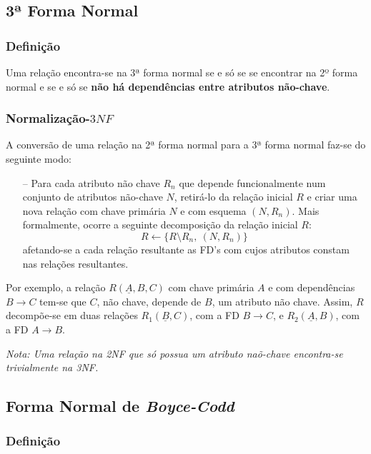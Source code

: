 \documentclass[oneside]{book}
\theoremstyle{definition}
\begin{document}
\subsection{3ª Forma Normal}

\subsubsection*{Definição}

Uma relação encontra-se na 3ª forma normal se e só se se encontrar na 2º forma normal e se e só se \textbf{não há dependências entre atributos não-chave}.

\subsubsection*{Normalização-$3NF$}

A conversão de uma relação na 2ª forma normal para a 3ª forma normal faz-se do seguinte modo:

\begin{itemize}
    \itemsep0cm
    \item[--] Para cada atributo não chave $R_n$ que depende funcionalmente num conjunto de atributos não-chave $N$, retirá-lo da relação inicial $R$ e criar uma nova relação com chave primária $N$ e com esquema $(N, R_n)$. Mais formalmente, ocorre a seguinte decomposição da relação inicial $R$: 
    \[
        R \gets \{R \setminus R_n,\:  (N, R_n)\}
    \]
    afetando-se a cada relação resultante as FD's com cujos atributos constam nas relações resultantes.
\end{itemize}

Por exemplo, a relação $R(\underline{A}, B, C)$ com chave primária $A$ e com dependências $B \rightarrow C$ tem-se que $C$, não chave, depende de $B$, um atributo não chave. Assim, $R$ decompõe-se em duas relações $R_1(\underline{B}, C)$, com a FD $B \rightarrow C$, e $R_2(\underline{A}, B)$, com a FD $A \rightarrow B$.

\vspace*{0.3em}
\textit{Nota: Uma relação na 2NF que só possua um atributo naõ-chave encontra-se trivialmente na 3NF.}

\subsection{Forma Normal de \textit{Boyce-Codd}}

\subsubsection*{Definição}
\end{document}
